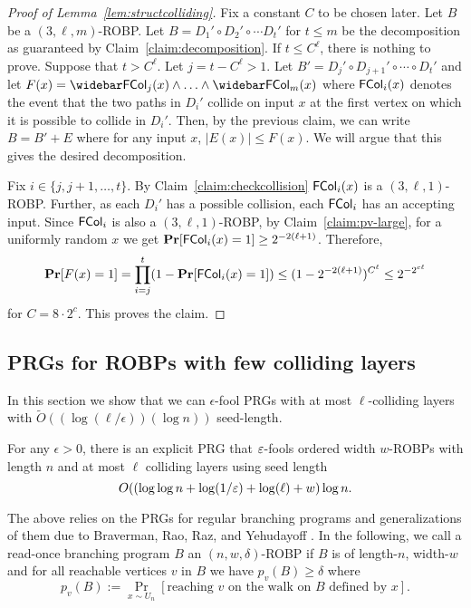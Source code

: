 \begin{proof}[Proof of Lemma~\ref{lem:structcolliding}]
Fix a constant $C$ to be chosen later. Let $B$ be a $(3,\ell,m)$-ROBP. Let $B = D_1' \circ D_2' \circ \cdots D_t'$ for $t \leq m$ be the decomposition as guaranteed by Claim~\ref{claim:decomposition}. If $t \leq C^\ell$, there is nothing to prove. Suppose that $t > C^\ell$. Let $j = t - C^\ell > 1$. Let $B' = D_j' \circ D_{j+1}' \circ \cdots \circ D_t'$ and let $F(x) = \bar{\FCol_j(x)} \wedge  \ldots \wedge \bar{\FCol_m(x)}$ where ${\mathsf{FCol}}_{i}(x)$ denotes the event that the two paths in $D_{i}'$ collide on input $x$ at the first vertex on which it is possible to collide in $D_i'$. Then, by the previous claim, we can write $B = B' + E$ where for any input $x$, $|E(x)| \leq F(x)$. We will argue that this gives the desired decomposition. 

Fix $i \in \{j, j+1,\ldots, t\}$. By Claim~\ref{claim:checkcollision} ${\mathsf{FCol}}_i(x)$ is a $(3,\ell,1)$-ROBP. Further, as each $D_i'$ has a possible collision, each ${\mathsf{FCol}}_{i}$ has an accepting input. Since ${\mathsf{FCol}}_i$ is also a $(3,\ell,1)$-ROBP, by Claim~\ref{claim:pv-large}, for a uniformly random $x$ we get $\mathop{\bf Pr\/}[{\mathsf{FCol}}_{i}(x) = 1] \geq 2^{-2(\ell+1)}$. Therefore,
\begin{align*}
\mathop{\bf Pr\/}[F(x) = 1] = \prod_{i=j}^{t} (1 - \mathop{\bf Pr\/}[{\mathsf{FCol}}_i(x) = 1]) \leq (1 - 2^{-2(\ell+1)})^{C^\ell} \leq 2^{-2^{c\ell}}
\end{align*}
for $C = 8 \cdot 2^c$. This proves the claim. 
\end{proof}

\subsection{PRGs for ROBPs with few colliding layers}
In this section we show that we can $\epsilon$-fool PRGs with at most $\ell$-colliding layers with $\tilde{O}((\log(\ell/\epsilon)) (\log n))$ seed-length. 

\begin{theorem}\label{thm:foolfewcollisions}
For any $\epsilon > 0$, there is an explicit PRG that $\varepsilon$-fools ordered width $w$-ROBPs with length $n$ and at most $\ell$ colliding layers using seed length
$$O((\log \log n + \log(1/\varepsilon) + \log(\ell) + w) \log n.$$
\end{theorem}

The above relies on the PRGs for regular branching programs and generalizations of them due to Braverman, Rao, Raz, and Yehudayoff \cite{BravermanRRY10}. In the following, we call a read-once branching program $B$ an $(n,w,\delta)$-ROBP if $B$ is of length-$n$, width-$w$ and for all reachable vertices $v$ in $B$ we have $p_v(B) \ge \delta$ where  $$p_v(B):= \Pr_{x \sim U_n}[\text{reaching $v$ on the walk on $B$ defined by $x$}].$$

